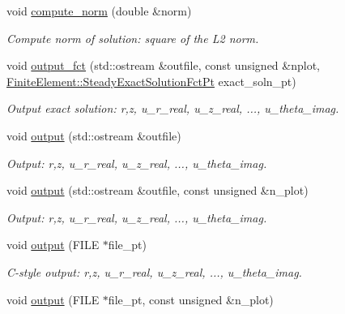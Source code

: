 \begin{DoxyCompactItemize}
void \hyperlink{classoomph_1_1TimeHarmonicFourierDecomposedLinearElasticityEquations_a5dc79c23b17db6bf138f757859e2b53e}{compute\+\_\+norm} (double \&norm)
\begin{DoxyCompactList}\small\item\em Compute norm of solution\+: square of the L2 norm. \end{DoxyCompactList}\item 
void \hyperlink{classoomph_1_1TimeHarmonicFourierDecomposedLinearElasticityEquations_a55bdbed4f99fe87124edba907acdf581}{output\+\_\+fct} (std\+::ostream \&outfile, const unsigned \&nplot, \hyperlink{classoomph_1_1FiniteElement_a690fd33af26cc3e84f39bba6d5a85202}{Finite\+Element\+::\+Steady\+Exact\+Solution\+Fct\+Pt} exact\+\_\+soln\+\_\+pt)
\begin{DoxyCompactList}\small\item\em Output exact solution\+: r,z, u\+\_\+r\+\_\+real, u\+\_\+z\+\_\+real, ..., u\+\_\+theta\+\_\+imag. \end{DoxyCompactList}\item 
void \hyperlink{classoomph_1_1TimeHarmonicFourierDecomposedLinearElasticityEquations_a31a091df2b2e53d6998585c992c9e724}{output} (std\+::ostream \&outfile)
\begin{DoxyCompactList}\small\item\em Output\+: r,z, u\+\_\+r\+\_\+real, u\+\_\+z\+\_\+real, ..., u\+\_\+theta\+\_\+imag. \end{DoxyCompactList}\item 
void \hyperlink{classoomph_1_1TimeHarmonicFourierDecomposedLinearElasticityEquations_ae93876a9ca68be25baa7cd1d4178990e}{output} (std\+::ostream \&outfile, const unsigned \&n\+\_\+plot)
\begin{DoxyCompactList}\small\item\em Output\+: r,z, u\+\_\+r\+\_\+real, u\+\_\+z\+\_\+real, ..., u\+\_\+theta\+\_\+imag. \end{DoxyCompactList}\item 
void \hyperlink{classoomph_1_1TimeHarmonicFourierDecomposedLinearElasticityEquations_ae2f89d9d35bf4904328dd32e7f8abbfa}{output} (F\+I\+LE $\ast$file\+\_\+pt)
\begin{DoxyCompactList}\small\item\em C-\/style output\+: r,z, u\+\_\+r\+\_\+real, u\+\_\+z\+\_\+real, ..., u\+\_\+theta\+\_\+imag. \end{DoxyCompactList}\item 
void \hyperlink{classoomph_1_1TimeHarmonicFourierDecomposedLinearElasticityEquations_a50b96a6a3cba3791978eb49b5cfcba39}{output} (F\+I\+LE $\ast$file\+\_\+pt, const unsigned \&n\+\_\+plot)

\end{DoxyCompactItemize}
